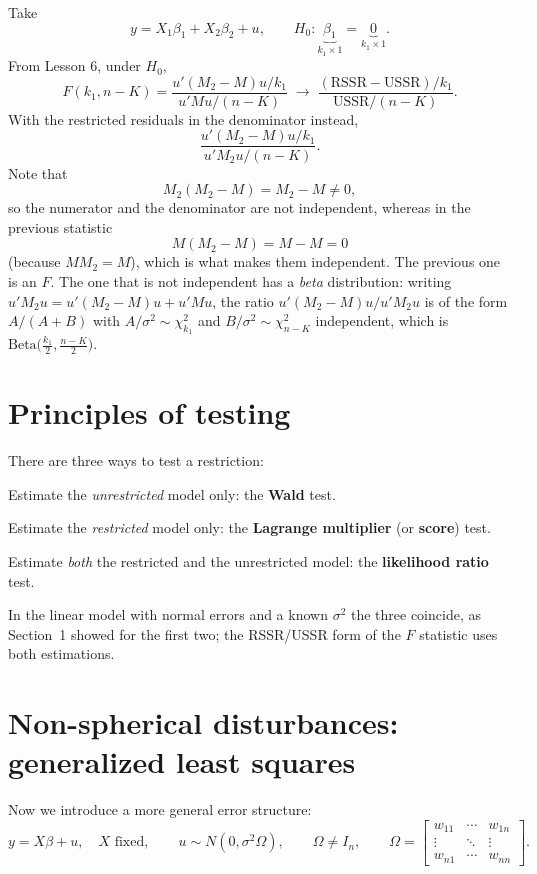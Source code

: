 \documentclass[11pt]{article}
\begin{document}
Take
\[ y = X_{1}\beta_{1} + X_{2}\beta_{2} + u, \qquad
   H_{0} : \underbrace{\beta_{1}}_{k_{1}\times1} = \underbrace{0}_{k_{1}\times1}. \]
From Lesson 6, under $H_{0}$,
\[ F(k_{1}, n - K) = \frac{u'(M_{2} - M)u/k_{1}}{u'Mu/(n - K)}
   \;\longrightarrow\;
   \frac{(\text{RSSR} - \text{USSR})/k_{1}}{\text{USSR}/(n - K)} . \]
With the restricted residuals in the denominator instead,
\[ \frac{u'(M_{2} - M)u/k_{1}}{u'M_{2}u/(n - K)} . \]
Note that
\[ M_{2}(M_{2} - M) = M_{2} - M \neq 0, \]
so the numerator and the denominator are not independent, whereas in the previous
statistic
\[ M(M_{2} - M) = M - M = 0 \]
(because $MM_{2} = M$), which is what makes them independent. The previous one is
an $F$. The one that is not independent has a \emph{beta} distribution: writing
$u'M_{2}u = u'(M_{2} - M)u + u'Mu$, the ratio $u'(M_{2}-M)u/u'M_{2}u$ is of the form
$A/(A + B)$ with $A/\sigma^{2} \sim \chi^{2}_{k_{1}}$ and
$B/\sigma^{2} \sim \chi^{2}_{n-K}$ independent, which is
$\text{Beta}\bigl(\tfrac{k_{1}}{2}, \tfrac{n-K}{2}\bigr)$.


\section{Principles of testing}

There are three ways to test a restriction:
\begin{flatnum}
  \item[\textcircled{\scriptsize 1}] Estimate the \emph{unrestricted} model only:
        the \textbf{Wald} test.
  \item[\textcircled{\scriptsize 2}] Estimate the \emph{restricted} model only:
        the \textbf{Lagrange multiplier} (or \textbf{score}) test.
  \item[\textcircled{\scriptsize 3}] Estimate \emph{both} the restricted and the
        unrestricted model: the \textbf{likelihood ratio} test.
\end{flatnum}
In the linear model with normal errors and a known $\sigma^{2}$ the three coincide,
as Section~1 showed for the first two; the RSSR/USSR form of the $F$ statistic uses
both estimations.


\section{Non-spherical disturbances: generalized least squares}

Now we introduce a more general error structure:
\[ y = X\beta + u, \quad X \text{ fixed}, \qquad
   u \sim N(0, \sigma^{2}\Omega), \qquad \Omega \neq I_{n}, \qquad
   \Omega = \begin{bmatrix}
     w_{11} & \cdots & w_{1n}\\
     \vdots & \ddots & \vdots\\
     w_{n1} & \cdots & w_{nn}
   \end{bmatrix}. \]
\end{document}
